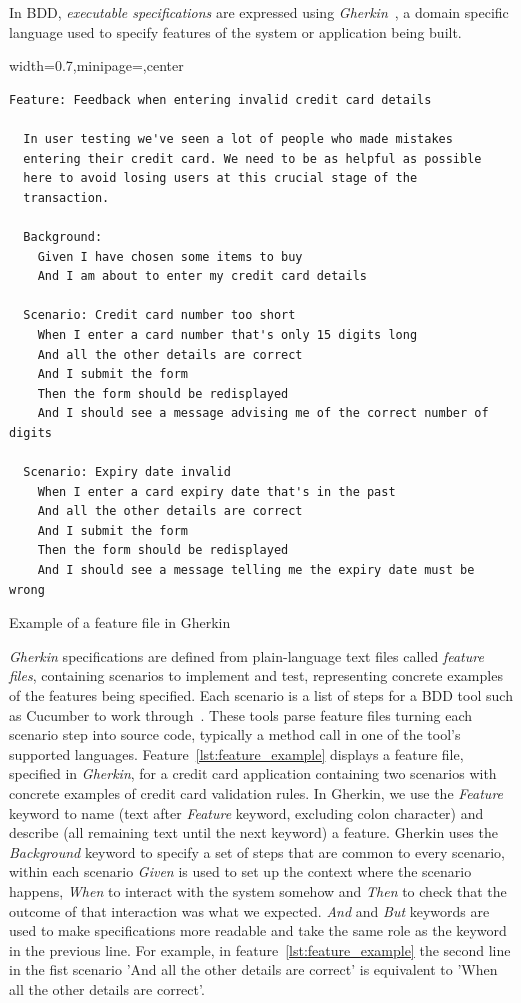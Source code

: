 \documentclass[dissertation,final]{softeng}
\newenvironment{featurecode}[1]
{ \lrbox\featurebox \begin{adjustbox}{width=#1\textwidth,minipage=\textwidth,center} }
{ \end{adjustbox}\endlrbox}
\newenvironment{featurelist}[2]
{
\newcommand{\setcaption}{\caption{#1}}
\newcommand{\setlabel}{\label{#2}}
}
{\begin{listing}\centering\usebox\featurebox\setcaption\setlabel\end{listing}}
\begin{document}
In BDD, \emph{executable specifications} are expressed using \emph{Gherkin}~\citep{wynne2012cucumber}, a domain specific language used to specify features of the system or application being built. 

\begin{featurelist}{Example of a feature file in Gherkin~\citep{wynne2012cucumber}}{lst:feature_example}
\begin{featurecode}{0.7}
\begin{verbatim}
Feature: Feedback when entering invalid credit card details

  In user testing we've seen a lot of people who made mistakes
  entering their credit card. We need to be as helpful as possible
  here to avoid losing users at this crucial stage of the
  transaction.

  Background:
    Given I have chosen some items to buy
    And I am about to enter my credit card details

  Scenario: Credit card number too short
    When I enter a card number that's only 15 digits long
    And all the other details are correct
    And I submit the form
    Then the form should be redisplayed
    And I should see a message advising me of the correct number of digits

  Scenario: Expiry date invalid
    When I enter a card expiry date that's in the past
    And all the other details are correct
    And I submit the form
    Then the form should be redisplayed
    And I should see a message telling me the expiry date must be wrong
\end{verbatim}
\end{featurecode}
\end{featurelist}

\emph{Gherkin} specifications are  defined from plain-language text files called \emph{feature files}, containing scenarios to implement and test, representing concrete examples of the features being specified. Each scenario is a list of steps for a BDD tool such as Cucumber to work through~\citep{wynne2012cucumber}. These tools parse feature files turning each scenario step into source code, typically a method call in one of the tool's supported languages. 
Feature~\ref{lst:feature_example} displays a feature file, specified in \emph{Gherkin}, for a credit card application containing two scenarios with concrete examples of credit card validation rules. In Gherkin, we use the \emph{Feature} keyword to name (text after \emph{Feature} keyword, excluding colon character) and describe (all remaining text until the next keyword) a feature. Gherkin uses the \emph{Background} keyword to specify a set of steps that are common to every scenario, within each scenario \emph{Given} is used to set up the context where the scenario happens, \emph{When} to interact with the system somehow and \emph{Then} to check that the outcome of that interaction was what we expected. \emph{And} and \emph{But} keywords are used to make specifications more readable and take the same role as the keyword in the previous line. For example, in feature~\ref{lst:feature_example} the second line in the fist scenario 'And all the other details are correct' is equivalent to 'When all the other details are correct'.
\end{document}
